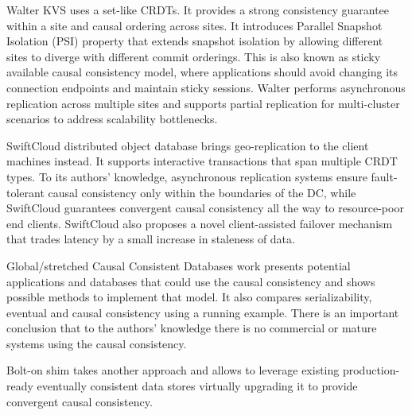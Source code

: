 \documentclass[conference]{IEEEtran}
\begin{document}
Walter\cite{b11} KVS uses a set-like CRDTs. It provides a strong consistency
guarantee within a site and causal ordering across sites. It introduces
Parallel Snapshot Isolation (PSI) property that extends snapshot isolation by
allowing different sites to diverge with different commit orderings. This is
also known as sticky available causal consistency model, where applications
should avoid changing its connection endpoints and maintain sticky sessions.
Walter performs asynchronous replication across multiple sites and supports
partial replication for multi-cluster scenarios to address scalability
bottlenecks.

SwiftCloud distributed object database\cite{b12} brings geo-replication to the
client machines instead. It supports interactive transactions that span
multiple CRDT types. To its authors' knowledge, asynchronous replication
systems ensure fault-tolerant causal consistency only within the boundaries of
the DC, while SwiftCloud guarantees convergent causal consistency all the way
to resource-poor end clients. SwiftCloud also proposes a novel client-assisted
failover mechanism that trades latency by a small increase in staleness of
data.

Global/stretched Causal Consistent Databases\cite{b6} work presents potential
applications and databases that could use the causal consistency and shows
possible methods to implement that model. It also compares serializability,
eventual and causal consistency using a running example. There is an important
conclusion that to the authors’ knowledge there is no commercial or mature
systems using the causal consistency.

Bolt-on\cite{b13} shim takes another approach and allows to leverage existing
production-ready eventually consistent data stores virtually upgrading it to
provide convergent causal consistency.
\end{document}
